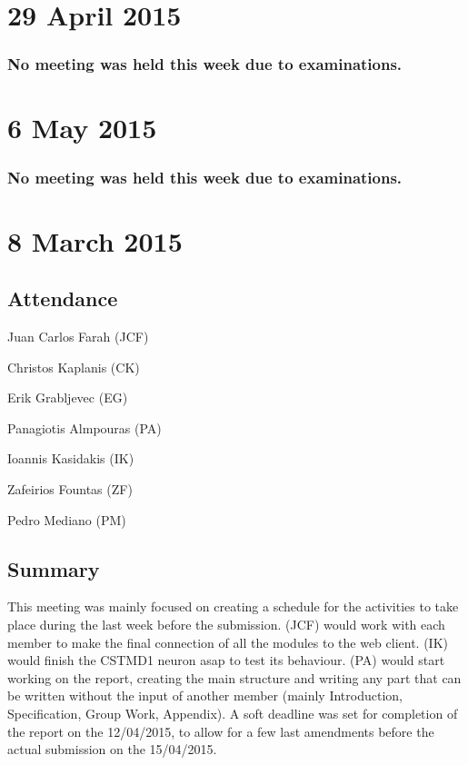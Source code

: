 \documentclass[a4paper,11pt]{article}
\begin{document}
\maketitle
\section*{29 April 2015}
\subsubsection*{No meeting was held this week due to examinations.}

\maketitle
\section*{6 May 2015}
\subsubsection*{No meeting was held this week due to examinations.}

\maketitle
\section*{8 March 2015}
\subsection*{Attendance}
\begin{compactenum}
\item Juan Carlos Farah (JCF)
\item Christos Kaplanis (CK)
\item Erik Grabljevec (EG)
\item Panagiotis Almpouras (PA)
\item Ioannis Kasidakis (IK)
\item Zafeirios Fountas (ZF)
\item Pedro Mediano (PM)
\end{compactenum}

\subsection*{Summary}
This meeting was mainly focused on creating a schedule for the activities to take place during the last week before the submission. (JCF) would work with each member to make the final connection of all the modules to the web client. (IK) would finish the CSTMD1 neuron asap to test its behaviour. (PA) would start working on the report, creating the main structure and writing any part that can be written without the input of another member (mainly Introduction,  Specification, Group Work, Appendix). A soft deadline was set for completion of the report on the 12/04/2015, to allow for a few last amendments before the actual submission on the 15/04/2015.
\end{document}
